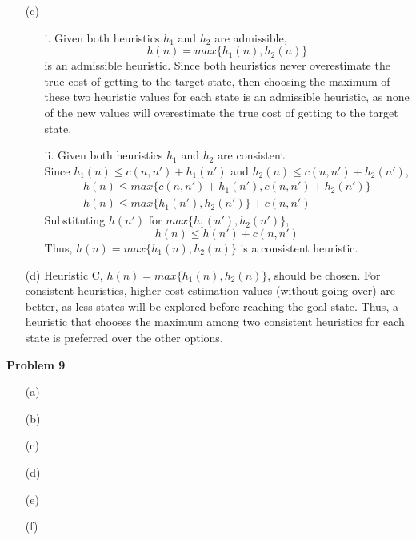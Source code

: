 \documentclass[11pt]{article}
\begin{document}
\begin{enumerate}
        \item[(c)]
            \begin{enumerate}
                \item[i.] Given both heuristics $h_1$ and $h_2$ are admissible,
                \[h(n) = max\{h_1(n), h_2(n)\}\] is an admissible heuristic.
                Since both heuristics never overestimate the true cost of getting to the target state, then choosing the maximum
                of these two heuristic values for each state is an admissible heuristic, as none of the
                new values will overestimate the true cost of getting to the target state.
                \item[ii.] Given both heuristics $h_1$ and $h_2$ are consistent: \\
                Since $h_1(n) \leq c(n, n') + h_1(n')$ and $h_2(n) \leq c(n, n') + h_2(n')$,
                \begin{gather*}
                    h(n) \leq max\{c(n, n') + h_1(n'), c(n, n') + h_2(n')\}\\
                    h(n) \leq max\{h_1(n'), h_2(n')\} + c(n, n')
                \end{gather*}
                Substituting $h(n')$ for $max\{h_1(n'), h_2(n')\}$,
                \[h(n) \leq h(n') + c(n, n')\]
                Thus, $h(n) = max\{h_1(n), h_2(n)\}$ is a consistent heuristic.
            \end{enumerate}
        \item[(d)] Heuristic C, $h(n) = max\{h_1(n), h_2(n)\}$, should be chosen.
        For consistent heuristics, higher cost estimation values (without going over) are better,
        as less states will be explored before reaching the goal state.
        Thus, a heuristic that chooses the maximum among two consistent heuristics for each state is preferred
        over the other options.
    \end{enumerate}

    \begin{center}
        \Large
        \textbf{Problem 9}
    \end{center}
    \normalsize
    \begin{enumerate}
        \item[(a)] %
        \item[(b)] %
        \item[(c)] %
        \item[(d)] %
        \item[(e)] %
        \item[(f)] %
    \end{enumerate}
\end{document}
